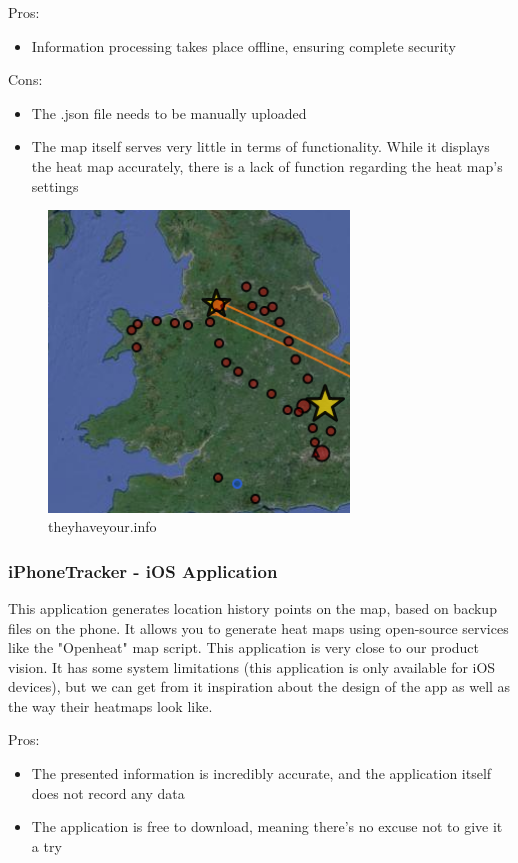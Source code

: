 \documentclass[12p]{article}
\begin{document}
Pros:
\begin{itemize}
    \item Information processing takes place offline, ensuring complete security
\end{itemize}

Cons:
\begin{itemize}
    \item The .json file needs to be manually uploaded
    \item The map itself serves very little in terms of functionality. While it displays the heat map accurately, there is a lack of function regarding the heat map’s settings
\end{itemize}

\begin{figure}[ht]
	    \center
        \includegraphics[height=8cm,keepaspectratio]{pics/state-of-the-art/info.png}
        \caption{theyhaveyour.info}
    \end{figure}

\subsubsection[iPhoneTracker - iOS Application]{iPhoneTracker - iOS Application \cite{iPhoneTracker}}
This application generates location history points on the map, based on backup files on the phone. It allows you to generate heat maps using open-source services like the "Openheat" map script. This application is very close to our product vision. It has some system limitations (this application is only available for iOS devices), but we can get from it inspiration about the design of the app as well as the way their heatmaps look like.

Pros:
\begin{itemize}
    \item The presented information is incredibly accurate, and the application itself does not record any data
    \item The application is free to download, meaning there's no excuse not to give it a try
\end{itemize}
\end{document}

